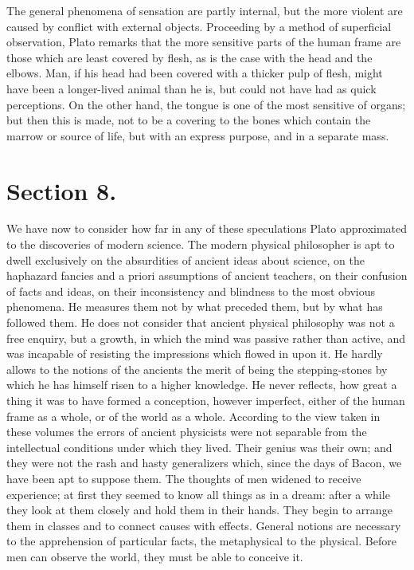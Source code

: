 \documentclass[11pt,letter]{article}
\begin{document}
\par  The general phenomena of sensation are partly internal, but the more violent are caused by conflict with external objects. Proceeding by a method of superficial observation, Plato remarks that the more sensitive parts of the human frame are those which are least covered by flesh, as is the case with the head and the elbows. Man, if his head had been covered with a thicker pulp of flesh, might have been a longer-lived animal than he is, but could not have had as quick perceptions. On the other hand, the tongue is one of the most sensitive of organs; but then this is made, not to be a covering to the bones which contain the marrow or source of life, but with an express purpose, and in a separate mass.

\par 
\section{
      Section 8.
    }
\par  We have now to consider how far in any of these speculations Plato approximated to the discoveries of modern science. The modern physical philosopher is apt to dwell exclusively on the absurdities of ancient ideas about science, on the haphazard fancies and a priori assumptions of ancient teachers, on their confusion of facts and ideas, on their inconsistency and blindness to the most obvious phenomena. He measures them not by what preceded them, but by what has followed them. He does not consider that ancient physical philosophy was not a free enquiry, but a growth, in which the mind was passive rather than active, and was incapable of resisting the impressions which flowed in upon it. He hardly allows to the notions of the ancients the merit of being the stepping-stones by which he has himself risen to a higher knowledge. He never reflects, how great a thing it was to have formed a conception, however imperfect, either of the human frame as a whole, or of the world as a whole. According to the view taken in these volumes the errors of ancient physicists were not separable from the intellectual conditions under which they lived. Their genius was their own; and they were not the rash and hasty generalizers which, since the days of Bacon, we have been apt to suppose them. The thoughts of men widened to receive experience; at first they seemed to know all things as in a dream: after a while they look at them closely and hold them in their hands. They begin to arrange them in classes and to connect causes with effects. General notions are necessary to the apprehension of particular facts, the metaphysical to the physical. Before men can observe the world, they must be able to conceive it.
\end{document}
